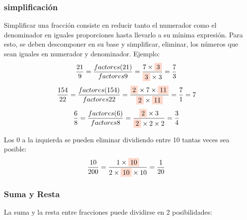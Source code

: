 \subsubsection*{simplificación}\label{simplificación}
    Simplificar una fracción consiste en reducir tanto el numerador como el
    denominador en iguales proporciones hasta llevarlo a su mínima expresión.
    Para esto, se deben descomponer en su base y simplificar, eliminar, los números
    que sean iguales en numerador y denominador. Ejemplo:
    $$ \frac{21}{9} = \frac{factores(21)}{factores{9}} = \frac{7\times \colorbox{RojoClaro}{3} }{\colorbox{RojoClaro}{3}\times3} = \frac{7}{3}  $$
    $$ \frac{154}{22} = \frac{factores(154)}{factores{22}} = \frac{\colorbox{RojoClaro}{2}\times7\times\colorbox{RojoClaro}{11}}{\colorbox{RojoClaro}{2}\times\colorbox{RojoClaro}{11}} = \frac{7}{1}=7  $$
    $$ \frac{6}{8} = \frac{factores(6)}{factores{8}} = \frac{\colorbox{RojoClaro}{2}\times3}{\colorbox{RojoClaro}{2}\times2\times2} = \frac{3}{4}  $$

    Los 0 a la izquierda se pueden eliminar dividiendo entre 10 tantas veces sea posible:
    $$ \frac{10}{200} = \frac{1\times\colorbox{RojoClaro}{10}}{2\times\colorbox{RojoClaro}{10}\times10} = \frac{1}{20}  $$


\subsubsection*{Suma y Resta}\label{suma}

    La suma y la resta entre fracciones puede dividirse en 2 posibilidades:

